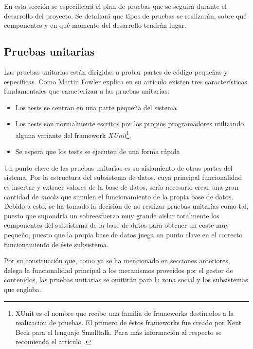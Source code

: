 En esta sección se especificará el plan de pruebas que se seguirá durante el desarrollo del proyecto.  Se detallará que tipos de pruebas se realizarán, sobre qué componentes y en qué momento del desarrollo tendrán lugar.


\subsection{Pruebas unitarias}
Las pruebas unitarias están dirigidas a probar partes de código pequeñas y específicas. Como Martin Fowler explica en su artículo \cite{mfowler:unit-testing} existen tres características fundamentales que caracterizan a las pruebas unitarias:
\begin{itemize}
	\item Los tests se centran en una parte pequeña del sistema
	\item Los tests son normalmente escritos por los propios programadores utilizando alguna variante del framework \textit{XUnit}\footnote{XUnit es el nombre que recibe una familia de frameworks destinados a la realización de pruebas.  El primero de éstos frameworks fue creado por Kent Beck para el lenguaje Smalltalk.  Para más información al respecto se recomienda el artículo \cite{mfowler:xunit}.}.
	\item Se espera que los tests se ejecuten de una forma rápida
\end{itemize}

Un punto clave de las pruebas unitarias es su aislamiento de otras partes del sistema.  Por la estructura del subsistema de datos, cuya principal funcionalidad es insertar y extraer valores de la base de datos, sería necesario crear una gran cantidad de \textit{mocks} que simulen el funcionamiento de la propia base de datos.  Debido a esto, se ha tomado la decisión de no realizar pruebas unitarias como tal, puesto que supondría un sobreesfuerzo muy grande aislar totalmente los componentes del subsistema de la base de datos para obtener un coste muy pequeño, puesto que la propia base de datos juega un punto clave en el correcto funcionamiento de éste subsistema.

Por su construcción que, como ya se ha mencionado en secciones anteriores, delega la funcionalidad principal a los mecanismos proveídos por el gestor de contenidos, las pruebas unitarias se omitirán para la zona social y los subsistemas que engloba.

